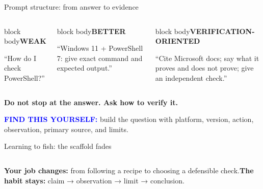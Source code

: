 \documentclass[aspectratio=169,11pt]{beamer}
\begin{document}
\begin{frame}{Prompt structure: from answer to evidence}\begin{columns}[T]\begin{beamercolorbox}[sep=.5em,wd=\linewidth]{block body}\textcolor{gold!80!black}{\textbf{WEAK}}\par “How do I check PowerShell?”\end{beamercolorbox}\begin{beamercolorbox}[sep=.5em,wd=\linewidth]{block body}\textbf{BETTER}\par “Windows 11 + PowerShell 7: give exact command and expected output.”\end{beamercolorbox}\begin{beamercolorbox}[sep=.5em,wd=\linewidth]{block body}\textbf{VERIFICATION-ORIENTED}\par “Cite Microsoft docs; say what it proves and does not prove; give an independent check.”\end{beamercolorbox}\end{columns}\vspace{.7cm}\begin{center}\Large\textcolor{gold!80!black}{\textbf{Do not stop at the answer. Ask how to verify it.}}\end{center}\vfill\textcolor{blue}{\textbf{FIND THIS YOURSELF:}} build the question with platform, version, action, observation, primary source, and limits.\end{frame}
\begin{frame}{Learning to fish: the scaffold fades}\vspace{.5cm}\begin{columns}[T]\textbf{Your job changes:} from following a recipe to choosing a defensible check.\textbf{The habit stays:} claim → observation → limit → conclusion.\end{columns}\vfill\ladder\end{frame}
\end{document}
